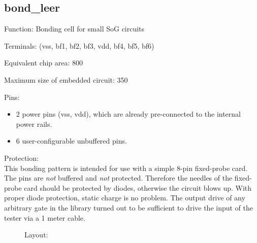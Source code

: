 \subsection{bond\_leer}

Function: Bonding cell for small SoG circuits

Terminals: (vss, bf1, bf2, bf3, vdd, bf4, bf5, bf6)

Equivalent chip area: 800

Maximum size of embedded circuit: 350

Pins:
\begin{itemize}
\item
2 power pins (vss, vdd), which are already pre-connected to 
the internal power rails.
\item
6 user-configurable unbuffered pins.
\end{itemize}

Protection:\\ This bonding pattern is intended for use with a simple
8-pin fixed-probe card. The pins are {\em not} buffered and {\em not}
protected. Therefore the needles of the fixed-probe card should be
protected by diodes, otherwise the circuit blows up. With proper
diode protection, static charge is no problem. The output drive of
any arbitrary gate in the library turned out to be sufficient to
drive the input of the tester via a 1 meter cable. 

\begin{figure}[bth]
Layout:\\

\end{figure}

\clearpage


